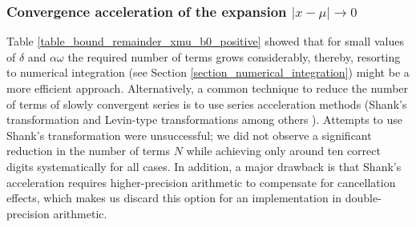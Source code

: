 \documentclass[10pt,a4paper,oneside]{article}
\numberwithin{equation}{section}
\begin{document}
\subsubsection{Convergence acceleration of the expansion $|x-\mu| \to 0$}
Table \ref{table_bound_remainder_xmu_b0_positive} showed that for small values of $\delta$ and $\alpha \omega$ the required number of terms grows considerably, thereby, resorting to numerical integration (see Section \ref{section_numerical_integration}) might be a more efficient approach. Alternatively, a common technique to reduce the number of terms of slowly convergent series is to use series acceleration methods (Shank's transformation and Levin-type transformations among others \cite[\S 9]{Gil2007}). 
Attempts to use Shank's transformation were unsuccessful; we did not observe a significant reduction in the number of terms $N$ while achieving only around ten correct digits systematically for all cases. In addition, a major drawback is that Shank's acceleration requires higher-precision arithmetic to compensate for cancellation effects, which makes us discard this option for an implementation in double-precision arithmetic. 
\end{document}
